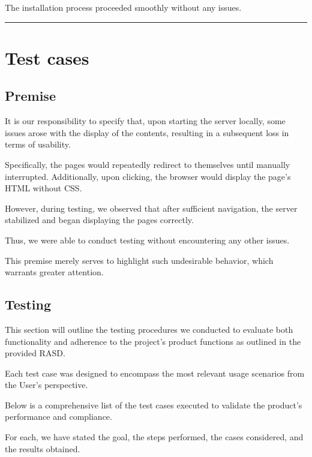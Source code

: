 \documentclass{Configuration_Files/Template}
\begin{document}
The installation process proceeded smoothly without any issues.

{\color{bluepoli}\rule{\linewidth}{0.1pt}}

\chapter{Test cases}

\section{Premise}

It is our responsibility to specify that, upon starting the server locally, some issues arose with the display of the contents, resulting in a subsequent loss in terms of usability.

Specifically, the pages would repeatedly redirect to themselves until manually interrupted. Additionally, upon clicking, the browser would display the page's HTML without CSS.

However, during testing, we observed that after sufficient navigation, the server stabilized and began displaying the pages correctly.

Thus, we were able to conduct testing without encountering any other issues.

This premise merely serves to highlight such undesirable behavior, which warrants greater attention.

\section{Testing}

This section will outline the testing procedures we conducted to evaluate both functionality and adherence to the project's product functions as outlined in the provided RASD.

Each test case was designed to encompass the most relevant usage scenarios from the User's perspective.

Below is a comprehensive list of the test cases executed to validate the product's performance and compliance.

For each, we have stated the goal, the steps performed, the cases considered, and the results obtained.\\
\end{document}
